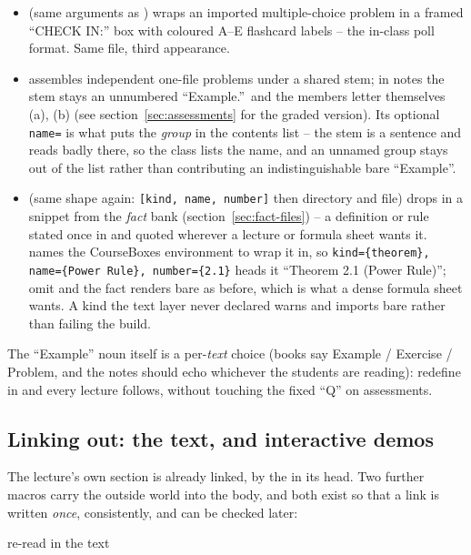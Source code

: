 \begin{itemize}
  \item {} (same arguments as ) wraps an
    imported multiple-choice problem in a framed ``CHECK IN:'' box with
    coloured A--E flashcard labels -- the in-class poll format. Same file,
    third appearance.
  \item {} assembles independent one-file problems under a
    shared stem; in notes the stem stays an unnumbered ``Example.''\ and the
    members letter themselves (a), (b) (see section~\ref{sec:assessments}
    for the graded version). Its optional \texttt{name=} is what puts the
    \emph{group} in the contents list -- the stem is a sentence and reads
    badly there, so the class lists the name, and an unnamed group stays out
    of the list rather than contributing an indistinguishable bare
    ``Example''.
  \item {} (same shape again: \texttt{[kind, name,
    number]} then directory and file) drops in a snippet from the \emph{fact}
    bank (section~\ref{sec:fact-files}) -- a definition or rule stated once
    in  and quoted wherever a lecture or formula sheet wants
    it.  names the CourseBoxes environment to wrap it in, so
    \texttt{kind=\{theorem\}, name=\{Power Rule\}, number=\{2.1\}} heads it
    ``Theorem 2.1 (Power Rule)''; omit  and the fact renders bare
    as before, which is what a dense formula sheet wants. A kind the text
    layer never declared warns and imports bare rather than failing the
    build.
\end{itemize}

The ``Example'' noun itself is a per-\emph{text} choice (books say Example /
Exercise / Problem, and the notes should echo whichever the students are
reading): redefine  in 
and every lecture follows, without touching the fixed ``Q'' on assessments.

\subsection{Linking out: the text, and interactive demos}

The lecture's own section is already linked, by the  in its
head. Two further macros carry the outside world into the body, and both exist
so that a link is written \emph{once}, consistently, and can be checked later:

\begin{manexsource}
re-read  in the text
\end{manexsource}

